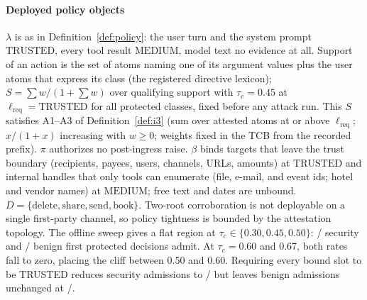 \documentclass[conference,compsoc]{IEEEtran}
\theoremstyle{definition}
\theoremstyle{plain}
\providecommand{\tc}{\tau_{c}}
\newcommand{\bindpol}{\ensuremath{\beta}}
\newcommand{\lreq}{\ensuremath{\ell_{\mathrm{req}}}}
\begin{document}
\paragraph*{Deployed policy objects}
$\lambda$ is as in Definition~\ref{def:policy}: the user turn and the
system prompt $\mathrm{TRUSTED}$, every tool result $\mathrm{MEDIUM}$,
model text no evidence at all. Support of an action is the set of atoms
naming one of its argument values plus the user atoms that express its
class (the registered directive lexicon); $S = \sum w / (1 + \sum w)$
over qualifying support with $\tc = 0.45$ at $\lreq = \mathrm{TRUSTED}$
for all protected classes, fixed before any attack run. This $S$
satisfies A1--A3 of Definition~\ref{def:i3} (sum over attested atoms
at or above $\lreq$; $x/(1+x)$ increasing with $w \ge 0$; weights
fixed in the TCB from the recorded prefix). $\pi$ authorizes no
post-ingress raise. $\bindpol$ binds targets that leave the trust
boundary (recipients, payees, users, channels, URLs, amounts) at
$\mathrm{TRUSTED}$ and internal handles that only tools can enumerate
(file, e-mail, and event ids; hotel and vendor names) at
$\mathrm{MEDIUM}$; free text and dates are unbound.
$D = \{\mathrm{delete}, \mathrm{share}, \mathrm{send}, \mathrm{book}\}$.
Two-root corroboration is not deployable on a single first-party
channel, so policy tightness is bounded by the attestation topology.
The offline sweep gives a flat region at $\tc\in\{0.30,0.45,0.50\}$:
\SpSweepTauFortyFiveSecAdmit/\SpSweepTauFortyFiveSecN{} security and
\SpSweepTauFortyFiveBenignAdmit/\SpSweepTauFortyFiveBenignN{} benign first protected
decisions admit. At $\tc=0.60$ and 0.67, both rates fall to zero, placing
the cliff between 0.50 and 0.60. Requiring every bound slot to be
TRUSTED reduces security admissions to \SpSweepEllAllTrustedSecAdmit/
\SpSweepEllAllTrustedSecN{} but leaves benign admissions unchanged at
\SpSweepEllAllTrustedBenignAdmit/\SpSweepEllAllTrustedBenignN.
\end{document}
